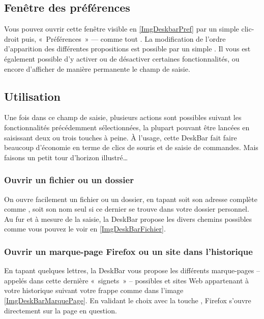 \subsection{Fenêtre des préférences}
Vous pouvez ouvrir cette fenêtre visible en \ref{ImgDeskbarPref} par un simple clic-droit puis, «~Préférences~» --- comme tout  . La modification de l'ordre d'apparition des différentes propositions est possible par un simple . Il vous est également possible d'y activer ou de désactiver certaines fonctionnalités, ou encore d'afficher de manière permanente le champ de saisie.
\subsection{Utilisation}
Une fois dans ce champ de saisie, plusieurs actions sont possibles suivant les fonctionnalités précédemment sélectionnées, la plupart pouvant être lancées en saisissant deux ou trois touches à peine. À l'usage, cette DeskBar fait faire beaucoup d'économie en terme de clics de souris et de saisie de commandes. Mais faisons un petit tour d'horizon illustré\ldots{}
\subsubsection{Ouvrir un fichier ou un dossier}
On ouvre facilement un fichier ou un dossier, en tapant soit son adresse complète comme , soit son nom seul  si ce dernier se trouve dans votre dossier personnel. Au fur et à mesure de la saisie, la DeskBar propose les divers chemins possibles comme vous pouvez le voir en \ref{ImgDeskBarFichier}.
\subsubsection{Ouvrir un marque-page Firefox ou un site dans l'historique}
En tapant quelques lettres, la DeskBar vous propose les différents marque-pages -- appelés dans cette dernière «~signets~» -- possibles et sites Web appartenant à votre historique suivant votre frappe comme dans l'image \ref{ImgDeskBarMarquePage}. En validant le choix avec la touche , Firefox s'ouvre directement sur la page en question.
